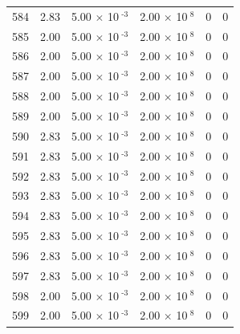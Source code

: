 \documentclass[a4paper,11pt]{article}
\begin{document}
\begin{center}
\begin{longtable}{|R{1.5cm}|R{2.4cm}|R{2.4cm}|R{2.4cm}|R{2.4cm}|R{2.4cm}|}
  584 &   2.83  &         5.00 $\times$ 10$^{\text{          -3}}$  &         2.00 $\times$ 10$^{\text{           8}}$  & 0  & 0 \\
  585 &   2.00  &         5.00 $\times$ 10$^{\text{          -3}}$  &         2.00 $\times$ 10$^{\text{           8}}$  & 0  & 0 \\
  586 &   2.00  &         5.00 $\times$ 10$^{\text{          -3}}$  &         2.00 $\times$ 10$^{\text{           8}}$  & 0  & 0 \\
  587 &   2.00  &         5.00 $\times$ 10$^{\text{          -3}}$  &         2.00 $\times$ 10$^{\text{           8}}$  & 0  & 0 \\
  588 &   2.00  &         5.00 $\times$ 10$^{\text{          -3}}$  &         2.00 $\times$ 10$^{\text{           8}}$  & 0  & 0 \\
  589 &   2.00  &         5.00 $\times$ 10$^{\text{          -3}}$  &         2.00 $\times$ 10$^{\text{           8}}$  & 0  & 0 \\
  590 &   2.83  &         5.00 $\times$ 10$^{\text{          -3}}$  &         2.00 $\times$ 10$^{\text{           8}}$  & 0  & 0 \\
  591 &   2.83  &         5.00 $\times$ 10$^{\text{          -3}}$  &         2.00 $\times$ 10$^{\text{           8}}$  & 0  & 0 \\
  592 &   2.83  &         5.00 $\times$ 10$^{\text{          -3}}$  &         2.00 $\times$ 10$^{\text{           8}}$  & 0  & 0 \\
  593 &   2.83  &         5.00 $\times$ 10$^{\text{          -3}}$  &         2.00 $\times$ 10$^{\text{           8}}$  & 0  & 0 \\
  594 &   2.83  &         5.00 $\times$ 10$^{\text{          -3}}$  &         2.00 $\times$ 10$^{\text{           8}}$  & 0  & 0 \\
  595 &   2.83  &         5.00 $\times$ 10$^{\text{          -3}}$  &         2.00 $\times$ 10$^{\text{           8}}$  & 0  & 0 \\
  596 &   2.83  &         5.00 $\times$ 10$^{\text{          -3}}$  &         2.00 $\times$ 10$^{\text{           8}}$  & 0  & 0 \\
  597 &   2.83  &         5.00 $\times$ 10$^{\text{          -3}}$  &         2.00 $\times$ 10$^{\text{           8}}$  & 0  & 0 \\
  598 &   2.00  &         5.00 $\times$ 10$^{\text{          -3}}$  &         2.00 $\times$ 10$^{\text{           8}}$  & 0  & 0 \\
  599 &   2.00  &         5.00 $\times$ 10$^{\text{          -3}}$  &         2.00 $\times$ 10$^{\text{           8}}$  & 0  & 0 \\

\end{longtable}
\end{center}
\end{document}
